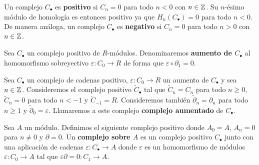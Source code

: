 \begin{definicion}
	Un complejo $C_{\bullet}$ es \textbf{positivo} si $C_{n}= 0$ para todo $n < 0$
	con $n \in \mathbb{Z}$. Su $n$-ésimo módulo de homología es entonces positivo ya que $H
	_{n}(C_{\bullet}) = 0$ para todo $n < 0$. De manera análoga, un complejo $C_{\bullet}$
	es \textbf{negativo} si $C_{n}= 0$ para todo $n > 0$ con $n \in \mathbb{Z}$.
\end{definicion}
%

\begin{definicion}
	Sea $C_{\bullet}$ un complejo positivo de $R$-módulos. Denominaremos \textbf{aumento
		de $C_{\bullet}$} al homomorfismo sobreyectivo $\varepsilon : C_{0}\to R$ de forma
	que $\varepsilon \circ \partial_{1}= 0$.
\end{definicion}

\begin{definicion}
	Sea $C_{\bullet}$ un complejo de cadenas positivo, $\varepsilon : C_{0}\to R$
	un aumento de $C_{\bullet}$ y sea $n \in \mathbb{Z}$. Consideremos el complejo positivo
	$\widetilde{C}_{\bullet}$ tal que $\widetilde{C}_{n}= C_{n}$ para todo $n \geq
	0$, $\widetilde{C}_{n}= 0$ para todo $n < -1$ y $\widetilde{C}_{-1}=R$. Consideremos
	también $\widetilde{\partial}_{n}= \partial_{n}$ para todo $n \geq 1$ y $\widetilde
	{\partial}_{0}= \varepsilon$. Llamaremos a este complejo \textbf{complejo
		aumentado} de $C_{\bullet}$.
\end{definicion}
%

\begin{definicion}
	Sea $A$ un módulo. Definimos el siguiente complejo positivo donde $A_{0}= A$, $A
	_{n}= 0$ para $n \neq 0$ y $\partial = 0$. Un \textbf{complejo sobre $A$} es un
	complejo positivo $C_{\bullet}$ junto con una aplicación de cadenas $\varepsilon
	: C_{\bullet}\to A$ donde $\varepsilon$ es un homomorfismo de módulos $\varepsilon
	: C_{0}\to A$ tal que $\varepsilon \partial = 0: C_{1}\to A$.
\end{definicion}

